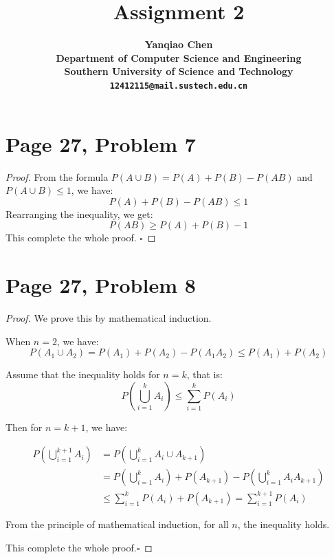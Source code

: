 \documentclass[a4paper, UTF-8]{article}
\theoremstyle{plain}
\begin{document}
\title{\bf{Assignment 2}}

\author{\bf{Yanqiao Chen}\\ 
  Department of Computer Science and Engineering\\
  Southern University of Science and Technology\\
  \texttt{12412115@mail.sustech.edu.cn}
  }


\maketitle

\section{Page 27, Problem 7}

\begin{proof}
From the formula $P(A\cup B) = P(A) + P(B) - P(AB)$ and $P(A \cup B) \leq 1$, we have:
$$
P(A) + P(B) - P(AB) \leq 1
$$
Rearranging the inequality, we get:
$$
P(AB) \geq P(A) + P(B) - 1
$$
This complete the whole proof. $\square$
\end{proof}

\section{Page 27, Problem 8}

\begin{proof}

We prove this by mathematical induction. 

When $n=2$, we have:
$$
P(A_1 \cup A_2) = P(A_1) + P(A_2) - P(A_1 A_2) \leq P(A_1) + P(A_2)
$$

Assume that the inequality holds for $n=k$, that is:
$$
P\left(\bigcup_{i=1}^k A_i\right) \leq \sum_{i=1}^k P(A_i)
$$

Then for $n=k+1$, we have:

\begin{align*}
P\left(\bigcup_{i=1}^{k+1} A_i\right) &= P\left(\bigcup_{i=1}^k A_i \cup A_{k+1}\right) \\
&= P\left(\bigcup_{i=1}^k A_i\right) + P(A_{k+1}) - P\left(\bigcup_{i=1}^k A_i A_{k+1}\right) \\
& \leq \sum_{i=1}^k P(A_i) + P(A_{k+1}) = \sum_{i=1}^{k+1} P(A_i)
\end{align*}

From the principle of mathematical induction, for all $n$, the inequality holds.

This complete the whole proof.$\square$
\end{proof}
\end{document}
